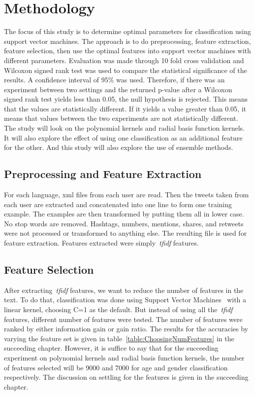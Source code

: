 \documentclass[a4paper]{llncs}
\begin{document}
\section{Methodology}
The focus of this study is to determine optimal parameters for classification using support vector machines. The approach is to do preprocessing, feature extraction, feature selection, then use the optimal features into support vector machines with different parameters. Evaluation was made through 10 fold cross validation and Wilcoxon signed rank test was used to compare the statistical significance of the results. A confidence interval of 95\% was used. Therefore, if there was an experiment between two settings and the returned p-value after a Wilcoxon signed rank test yields less than 0.05, the null hypothesis is rejected. This means that the values are statistically different. If it yields a value greater than 0.05, it means that values between the two experiments are not statistically different. The study will look on the polynomial kernels and radial basis function kernels. It will also explore the effect of using one classification as an additional feature for the other. And this study will also explore the use of ensemble methods. 

\subsection{Preprocessing and Feature Extraction}
For each language, xml files from each user are read. Then the tweets taken from each user are extracted and concatenated into one line to form one training example. The examples are then transformed by putting them all in lower case. No stop words are removed. Hashtags, numbers, mentions, shares, and retweets were not processed or transformed to anything else. The resulting file is used for feature extraction.  Features extracted were simply~\textit{tfidf} features.  


\subsection{Feature Selection}
After extracting~\textit{tfidf} features, we want to reduce the number of features in the text. To do that, classification was done using Support Vector Machines~\cite{cortes1995support} with a linear kernel, choosing C=1 as the default. But instead of using all the~\textit{tfidf} features, different number of features were tested. The number of features were ranked by either information gain or gain ratio. The results for the accuracies by varying the feature set is given in table~\ref{table:ChoosingNumFeatures} in the succeeding chapter. However, it is suffice to say that for the succeeding experiment on polynomial kernels and radial basis function kernels, the number of features selected will be 9000 and 7000 for age and gender classification respectively. The discussion on settling for the features is given in the succeeding chapter. 
\end{document}
